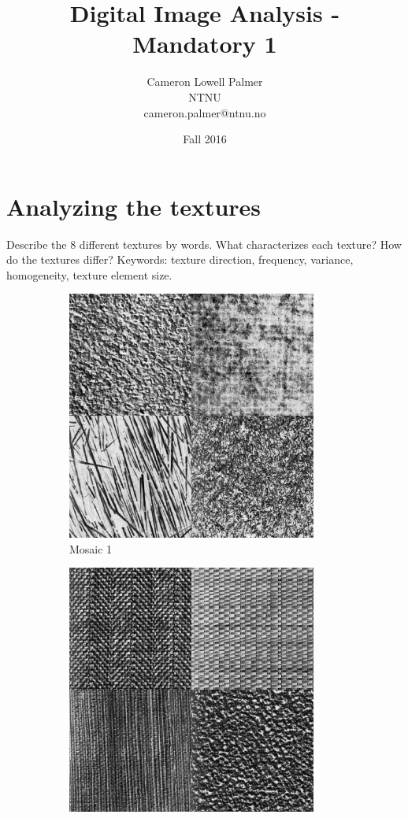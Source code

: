 \documentclass[a4paper,12pt,titlepage]{article}
\title{Digital Image Analysis - Mandatory 1}
\author{Cameron Lowell Palmer\\
	NTNU\\
	cameron.palmer@ntnu.no
}
\date{Fall 2016}
\begin{document}
\maketitle

\section{Analyzing the textures}
Describe the 8 different textures by words. What characterizes each texture? How do the textures differ? Keywords: texture direction, frequency, variance, homogeneity, texture element size.

\begin{figure}[H]
\begin{subfigure}{0.5\textwidth}
\includegraphics[width=0.9\textwidth]{textures/mosaic1}
\caption{Mosaic 1}
\label{fig:Mosaic1}
\end{subfigure}
\begin{subfigure}{0.5\textwidth}
\includegraphics[width=0.9\textwidth]{textures/mosaic2}

\end{subfigure}
\end{figure}
\end{document}
